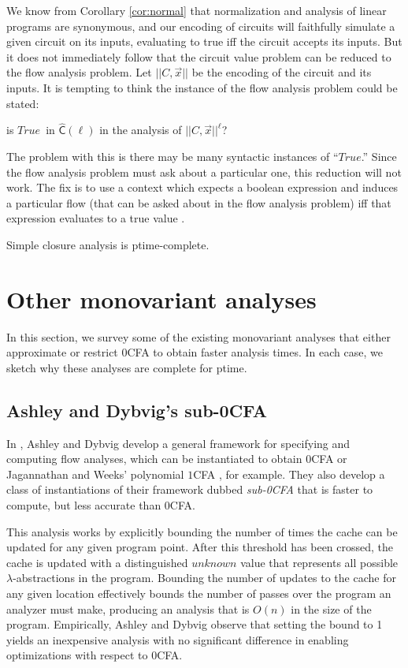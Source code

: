 \documentclass{llncs}
\newcommand\True{\ensuremath{\mathit{True}}}
\newcommand\unknown{\ensuremath{\mathit{unknown}}}
\newcommand\ptime{{\sc ptime}}
\newcommand\cache{\widehat{\mathsf{C}}}
\begin{document}
We know from Corollary \ref{cor:normal} that normalization and
analysis of linear programs are synonymous, and our encoding of
circuits will faithfully simulate a given circuit on its inputs,
evaluating to true iff the circuit accepts its inputs.  But it does
not immediately follow that the circuit value problem can be reduced
to the flow analysis problem.  Let $||C,\vec{x}||$ be the encoding of
the circuit and its inputs.  It is tempting to think the instance of
the flow analysis problem could be stated:
\begin{center}
is \True\ in $\cache(\ell)$ in the analysis
of $||C,\vec{x}||^\ell$?
\end{center}
The problem with this is there may be many syntactic instances of
``\True.''  Since the flow analysis problem must ask about a particular
one, this reduction will not work.  The fix is to use a context which
expects a boolean expression and induces a particular flow (that can
be asked about in the flow analysis problem) iff that expression
evaluates to a true value \cite{vanhorn-mairson-07}.

\begin{corollary}
Simple closure analysis is \ptime-complete.
\end{corollary}

\section{Other monovariant analyses}

In this section, we survey some of the existing monovariant analyses
that either approximate or restrict 0CFA to obtain faster analysis
times.  In each case, we sketch why these analyses are complete for
\ptime.

\subsection{Ashley and Dybvig's sub-0CFA}
\label{sec:sub0}

In \cite{ashley-dybvig}, Ashley and Dybvig develop a general framework
for specifying and computing flow analyses, which can be instantiated
to obtain 0CFA or Jagannathan and Weeks' polynomial $1$CFA
\cite{jagannathan-weeks-95}, for example.  They also develop a class
of instantiations of their framework dubbed {\em sub-0CFA} that is
faster to compute, but less accurate than 0CFA.

This analysis works by explicitly bounding the number of times the
cache can be updated for any given program point.  After this
threshold has been crossed, the cache is updated with a distinguished
$\unknown$ value that represents all possible $\lambda$-abstractions
in the program.  Bounding the number of updates to the cache for any
given location effectively bounds the number of passes over the
program an analyzer must make, producing an analysis that is $O(n)$ in
the size of the program.  Empirically, Ashley and Dybvig observe that
setting the bound to 1 yields an inexpensive analysis with no
significant difference in enabling optimizations with respect to 0CFA.
\end{document}
